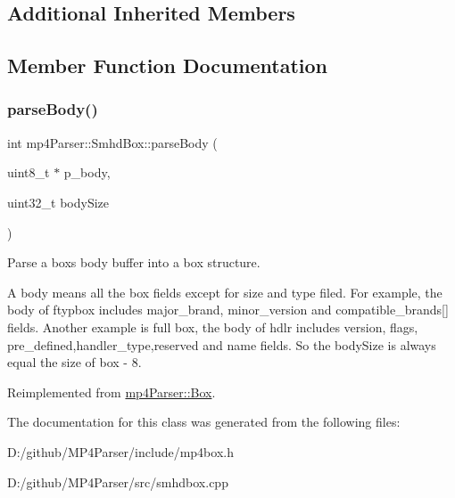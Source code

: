 \subsection*{Additional Inherited Members}


\subsection{Member Function Documentation}
\mbox{\label{classmp4_parser_1_1_smhd_box_a82ee0a15370b6fafad0dcef1081f9fd9}} 
\subsubsection{\texorpdfstring{parseBody()}{parseBody()}}
{\footnotesize\ttfamily int mp4\+Parser\+::\+Smhd\+Box\+::parse\+Body (\begin{DoxyParamCaption}\item[{uint8\+\_\+t $\ast$}]{p\+\_\+body,  }\item[{uint32\+\_\+t}]{body\+Size }\end{DoxyParamCaption})\hspace{0.3cm}{\ttfamily [virtual]}}



Parse a box\textquotesingle{}s body buffer into a box structure. 

A body means all the box fields except for size and type filed. For example, the body of ftypbox includes major\+\_\+brand, minor\+\_\+version and compatible\+\_\+brands\mbox{[}\mbox{]} fields. Another example is full box, the body of hdlr includes version, flags, pre\+\_\+defined,handler\+\_\+type,reserved and name fields. So the body\+Size is always equal the size of box -\/ 8. 

Reimplemented from \mbox{\hyperlink{classmp4_parser_1_1_box_a3dd0c084ac65bc77b69ac5ecaf796cb2}{mp4\+Parser\+::\+Box}}.



The documentation for this class was generated from the following files\+:\begin{DoxyCompactItemize}
\item 
D\+:/github/\+M\+P4\+Parser/include/mp4box.\+h\item 
D\+:/github/\+M\+P4\+Parser/src/smhdbox.\+cpp\end{DoxyCompactItemize}
